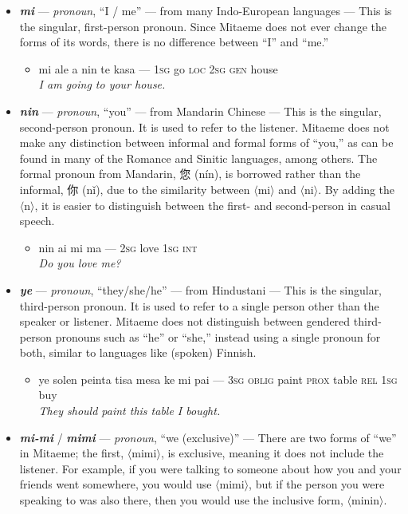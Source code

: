 \documentclass[a4paper, titlepage]{article}
\begin{document}
\begin{itemize}
	\item \textbf{\textit{mi}} — \textit{pronoun}, ``I / me'' — from many Indo-European languages — This is the singular, first-person pronoun. Since Mitaeme does not ever change the forms of its words, there is no difference between ``I'' and ``me.''
	\begin{itemize}
		\item mi ale a nin te kasa — \textsc{1sg} go \textsc{loc 2sg gen} house \\\textit{I am going to your house.}
	\end{itemize}
	\item \textbf{\textit{nin}} — \textit{pronoun}, ``you'' — from Mandarin Chinese — This is the singular, second-person pronoun. It is used to refer to the listener. Mitaeme does not make any distinction between informal and formal forms of ``you,'' as can be found in many of the Romance and Sinitic languages, among others. The formal pronoun from Mandarin, 您 (nín), is borrowed rather than the informal, 你 (nǐ), due to the similarity between $\langle$mi$\rangle$ and $\langle$ni$\rangle$. By adding the $\langle$n$\rangle$, it is easier to distinguish between the first- and second-person in casual speech.
	\begin{itemize}
		\item nin ai mi ma — \textsc{2sg} love \textsc{1sg int} \\\textit{Do you love me?}
	\end{itemize}
	\item \textbf{\textit{ye}} — \textit{pronoun}, ``they/she/he'' — from Hindustani — This is the singular, third-person pronoun. It is used to refer to a single person other than the speaker or listener. Mitaeme does not distinguish between gendered third-person pronouns such as ``he'' or ``she,'' instead using a single pronoun for both, similar to languages like (spoken) Finnish.
	\begin{itemize}
		\item ye solen peinta tisa mesa ke mi pai — \textsc{3sg oblig} paint \textsc{prox} table \textsc{rel 1sg} buy \\\textit{They should paint this table I bought.}
	\end{itemize}
	\item \textbf{\textit{mi-mi}} / \textbf{\textit{mimi}} — \textit{pronoun}, ``we (exclusive)'' — There are two forms of ``we'' in Mitaeme; the first, $\langle$mimi$\rangle$, is exclusive, meaning it does not include the listener. For example, if you were talking to someone about how you and your friends went somewhere, you would use $\langle$mimi$\rangle$, but if the person you were speaking to was also there, then you would use the inclusive form, $\langle$minin$\rangle$.

\end{itemize}
\end{document}
